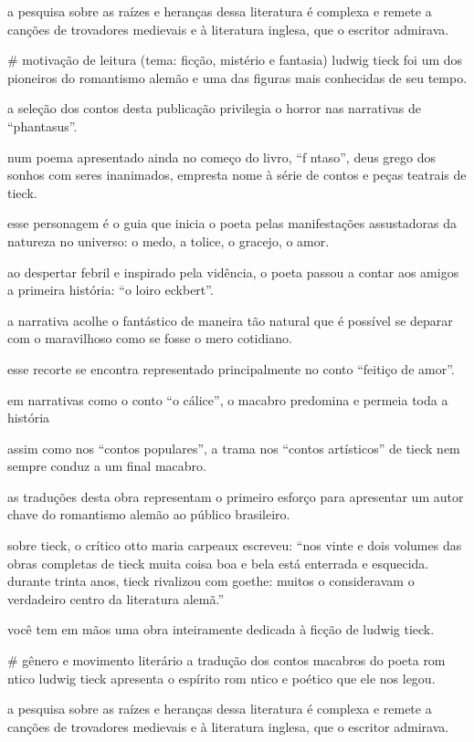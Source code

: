 a pesquisa sobre as raízes e heranças dessa literatura é complexa e remete a canções de trovadores medievais e à literatura inglesa, que o escritor admirava. 



# motivação de leitura (tema: ficção, mistério e fantasia)
ludwig tieck foi um dos pioneiros do romantismo alemão e uma das figuras mais conhecidas de seu tempo. 

a seleção dos contos desta publicação privilegia o horror nas narrativas de “phantasus”. 

num poema apresentado ainda no começo do livro, “f ntaso”, deus grego dos sonhos com seres inanimados, empresta nome à série de contos e peças teatrais de tieck. 

esse personagem é o guia que inicia o poeta pelas manifestações assustadoras da natureza no universo: o medo, a tolice, o gracejo, o amor. 

ao despertar febril e inspirado pela vidência, o poeta passou a contar aos amigos a primeira história: “o loiro eckbert”. 

a narrativa acolhe o fantástico de maneira tão natural que é possível se deparar com o maravilhoso como se fosse o mero cotidiano. 

esse recorte se encontra representado principalmente no conto “feitiço de amor”. 

em narrativas como o conto “o cálice”, o macabro predomina e permeia toda a história

assim como nos “contos populares”, a trama nos “contos artísticos” de tieck nem sempre conduz a um final macabro. 

as traduções desta obra representam o primeiro esforço para apresentar um autor chave do romantismo alemão ao público brasileiro.

sobre tieck, o crítico otto maria carpeaux escreveu: “nos vinte e dois volumes das obras completas de tieck muita coisa boa e bela está enterrada e esquecida. durante trinta anos, tieck rivalizou com goethe: muitos o consideravam o verdadeiro centro da literatura alemã.”

você tem em mãos uma obra inteiramente dedicada à ficção de ludwig tieck.


# gênero e movimento literário
a tradução dos contos macabros do poeta rom ntico ludwig tieck apresenta o espírito rom ntico e poético que ele nos legou. 

a pesquisa sobre as raízes e heranças dessa literatura é complexa e remete a canções de trovadores medievais e à literatura inglesa, que o escritor admirava. 

